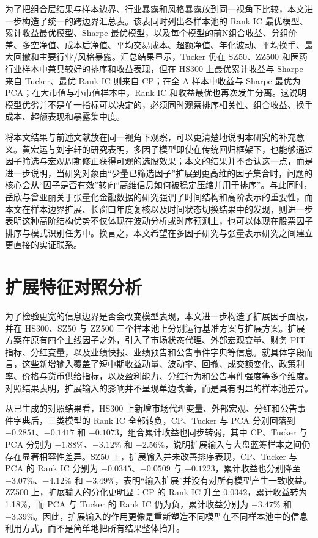 为了把组合层结果与样本边界、行业暴露和风格暴露放到同一视角下比较，本文进一步构造了统一的跨边界汇总表。该表同时列出各样本池的 Rank IC 最优模型、累计收益最优模型、Sharpe 最优模型，以及每个模型的前N组合收益、分组价差、多空净值、成本后净值、平均交易成本、超额净值、年化波动、平均换手、最大回撤和主要行业/风格暴露。汇总结果显示，Tucker 仍在 SZ50、ZZ500 和医药行业样本中兼具较好的排序和收益表现，但在 HS300 上最优累计收益与 Sharpe 来自 Tucker、最优 Rank IC 则来自 CP；在全 A 样本中收益与 Sharpe 最优为 PCA；在大市值与小市值样本中，Rank IC 和收益最优也再次发生分离。这说明模型优劣并不是单一指标可以决定的，必须同时观察排序相关性、组合收益、换手成本、超额表现和暴露集中度。

将本文结果与前述文献放在同一视角下观察，可以更清楚地说明本研究的补充意义。黄宏运与刘宇轩的研究表明，多因子模型即使在传统回归框架下，也能够通过因子筛选与宏观周期修正获得可观的选股效果；本文的结果并不否认这一点，而是进一步说明，当研究对象由“少量已筛选因子”扩展到更高维的因子集合时，问题的核心会从“因子是否有效”转向“高维信息如何被稳定压缩并用于排序”。与此同时，岳欣与曾亚丽关于张量化金融数据的研究强调了时间结构和高阶表示的重要性，而本文在样本边界扩展、长窗口年度复核以及时间状态切换结果中的发现，则进一步表明这种高阶结构优势不仅体现在波动分析或时序预测上，也可以体现在股票因子排序与模式识别任务中。换言之，本文希望在多因子研究与张量表示研究之间建立更直接的实证联系。

\section{扩展特征对照分析}

为了检验更宽的信息边界是否会改变模型表现，本文进一步构造了扩展因子面板，并在 HS300、SZ50 与 ZZ500 三个样本池上分别运行基准方案与扩展方案。扩展方案在原有四个主线因子之外，引入了市场状态代理、外部宏观变量、财务 PIT 指标、分红变量，以及业绩快报、业绩预告和公告事件字典等信息。就具体字段而言，这些新增输入覆盖了短中期收益动量、波动率、回撤、成交额变化、政策利率、价格与货币供给指标，以及盈利能力、分红行为和公告事件强度等多个维度。对照结果表明，扩展输入的影响并不呈现单边改善，而是具有明显的样本池差异。

从已生成的对照结果看，HS300 上新增市场代理变量、外部宏观、分红和公告事件字典后，三类模型的 Rank IC 全部转负，CP、Tucker 与 PCA 分别回落到 $-0.2851$、$-0.1417$ 和 $-0.1073$，组合累计收益也同步转弱，其中 CP、Tucker 与 PCA 分别为 $-1.88\%$、$-3.12\%$ 和 $-2.56\%$，说明扩展输入与大盘蓝筹样本之间仍存在显著相容性差异。SZ50 上，扩展输入并未改善排序表现，CP、Tucker 与 PCA 的 Rank IC 分别为 $-0.0345$、$-0.0509$ 与 $-0.1223$，累计收益也分别降至 $-3.07\%$、$-4.12\%$ 和 $-3.49\%$，表明“输入扩展”并没有对所有模型产生一致收益。ZZ500 上，扩展输入的分化更明显：CP 的 Rank IC 升至 0.0342，累计收益转为 1.18\%，而 PCA 与 Tucker 的 Rank IC 仍为负，累计收益分别为 $-3.47\%$ 和 $-3.39\%$。因此，扩展输入的作用更像是重新塑造不同模型在不同样本池中的信息利用方式，而不是简单地把所有结果整体抬升。

